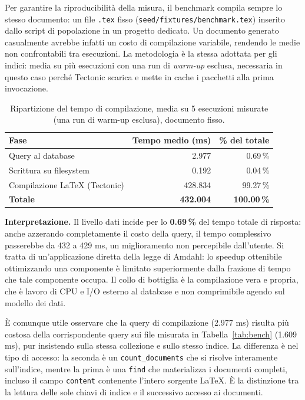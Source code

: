 \documentclass[11pt,a4paper]{article}
\begin{document}
Per garantire la riproducibilità della misura, il benchmark compila sempre lo stesso documento: un file \texttt{.tex} fisso (\texttt{seed/fixtures/benchmark.tex}) inserito dallo script di popolazione in un progetto dedicato. Un documento generato casualmente avrebbe infatti un costo di compilazione variabile, rendendo le medie non confrontabili tra esecuzioni. La metodologia è la stessa adottata per gli indici: media su più esecuzioni con una run di \emph{warm-up} esclusa, necessaria in questo caso perché Tectonic scarica e mette in cache i pacchetti alla prima invocazione.

\begin{table}[h!]
\centering
\small
\begin{tabular}{@{}lrr@{}}
\toprule
\textbf{Fase} & \textbf{Tempo medio (ms)} & \textbf{\% del totale} \\
\midrule
Query al database & 2.977 & 0.69\,\% \\
Scrittura su filesystem & 0.192 & 0.04\,\% \\
Compilazione LaTeX (Tectonic) & 428.834 & 99.27\,\% \\
\midrule
\textbf{Totale} & \textbf{432.004} & \textbf{100.00\,\%} \\
\bottomrule
\end{tabular}
\caption{Ripartizione del tempo di compilazione, media su 5 esecuzioni misurate (una run di warm-up esclusa), documento fisso.}
\end{table}

\textbf{Interpretazione.} Il livello dati incide per lo \textbf{0.69\,\%} del tempo totale di risposta: anche azzerando completamente il costo della query, il tempo complessivo passerebbe da 432 a 429 ms, un miglioramento non percepibile dall'utente. Si tratta di un'applicazione diretta della legge di Amdahl: lo speedup ottenibile ottimizzando una componente è limitato superiormente dalla frazione di tempo che tale componente occupa. Il collo di bottiglia è la compilazione vera e propria, che è lavoro di CPU e I/O esterno al database e non comprimibile agendo sul modello dei dati.

È comunque utile osservare che la query di compilazione (2.977 ms) risulta più costosa della corrispondente query sui file misurata in Tabella~\ref{tab:bench} (1.609 ms), pur insistendo sulla stessa collezione e sullo stesso indice. La differenza è nel tipo di accesso: la seconda è un \texttt{count\_documents} che si risolve interamente sull'indice, mentre la prima è una \texttt{find} che materializza i documenti completi, incluso il campo \texttt{content} contenente l'intero sorgente LaTeX. È la distinzione tra la lettura delle sole chiavi di indice e il successivo accesso ai documenti.
\end{document}
